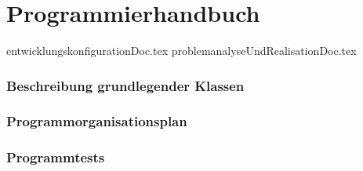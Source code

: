 \part{Programmierhandbuch}
{entwicklungskonfigurationDoc.tex}
{problemanalyseUndRealisationDoc.tex}
\section{Beschreibung grundlegender Klassen}
\section{Programmorganisationsplan}
\section{Programmtests}